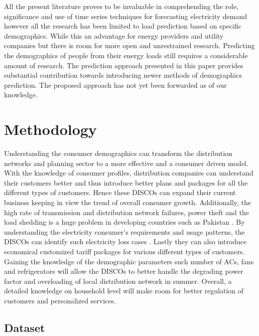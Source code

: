 \documentclass[conference]{IEEEtran}
\begin{document}
All the present literature proves to be invaluable in comprehending the role, significance and use of time series techniques for forecasting electricity demand however all the research has been limited to load prediction based on specific demographics. While this an advantage for energy providers and utility companies but there is room for more open and unrestrained research. Predicting the demographics of people from their energy loads still requires a considerable amount of research. The prediction approach presented in this paper provides substantial contribution towards introducing newer methods of demographics prediction. The proposed approach has not yet been forwarded as of our knowledge.\par



\section{Methodology}

Understanding  the  consumer demographics can transform the distribution networks and planning sector to a more effective and a consumer driven model. With the knowledge of consumer profiles, distribution companies can understand their customers better and thus introduce better plans and packages for all the different types of customers. Hence these DISCOs can expand their current business keeping in view the trend of overall consumer growth. Additionally, the high rate of transmission and distribution network failures, power theft and the load shedding is a huge problem in developing countries such as Pakistan \cite{articleHussain}. By understanding the electricity consumer's requirements and usage patterns, the DISCOs can identify such electricity loss cases \cite{articleJaiswal}. Lastly they can also introduce economical customized tariff packages for various different types of customers. Gaining the knowledge of the demographic parameters such number of ACs, fans and refrigerators will allow the DISCOs to better handle the degrading power factor and overloading of local distribution network in summer. Overall, a detailed knowledge on household level will make room for better regulation of customers and personalized services.


\subsection{Dataset}
\end{document}
